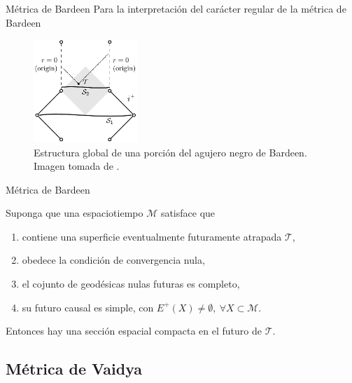 \documentclass[t]{beamer}
\numberwithin{equation}{section}
\begin{document}
\begin{frame}{Métrica de Bardeen}
Para la interpretación del carácter regular de la métrica de Bardeen

\begin{figure}[h!]
	\centering
	\includegraphics[width=0.35\textwidth]{bardeenDiagram}
	\caption{Estructura global de una porción del agujero negro de Bardeen. Imagen tomada de \cite{borde1994}.}
	\label{fig: bardeen diagram}
\end{figure}
\end{frame}

\begin{frame}{Métrica de Bardeen}
\vspace{\fill}
\begin{theorem}[Borde, 1996]
	\label{borde reg thm}
	Suponga que una espaciotiempo $\mathcal{M}$ satisface que
	
	\begin{enumerate}[i]
		\item contiene una superficie eventualmente futuramente atrapada $\mathcal{T}$,
		
		\item obedece la condición de convergencia nula,
		
		\item el cojunto de geodésicas nulas futuras es completo,
		
		\item su futuro causal es simple, con $E^{+}(X) \neq \emptyset,\ \forall X \subset \mathcal{M}$.
	\end{enumerate}
	
	Entonces hay una sección espacial compacta en el futuro de $\mathcal{T}$.
\end{theorem}
\vspace{\fill}
\end{frame}

\subsection{Métrica de Vaidya}
\end{document}
